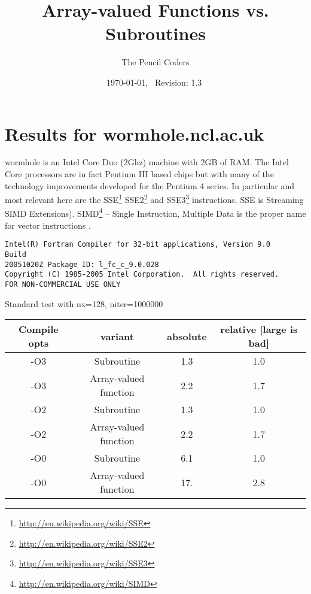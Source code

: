 \documentclass[a4paper,twoside,11pt]{article}
\newcommand{\fnurl}[1]{\footnote{\url{#1}}}
\begin{document}
\title{Array-valued Functions vs. Subroutines} %
\author{The Pencil Coders}          %
\date{\today,~ $ $Revision: 1.3 $ $}            %

\maketitle
\label{firstpage}


\section{Results for wormhole.ncl.ac.uk}
wormhole is an Intel Core Duo (2Ghz) machine with 2GB of RAM.  The Intel
Core processors are in fact Pentium III based chips but with many of the
technology improvements developed for the Pentium 4 series.  In particular
and most relevant here are the
SSE\fnurl{http://en.wikipedia.org/wiki/SSE}
SSE2\fnurl{http://en.wikipedia.org/wiki/SSE2} and
SSE3\fnurl{http://en.wikipedia.org/wiki/SSE3} instructions.  SSE is Streaming
SIMD Extensions). SIMD\fnurl{http://en.wikipedia.org/wiki/SIMD} -- Single Instruction, Multiple Data is the proper
name for vector instructions .
\begin{verbatim}
Intel(R) Fortran Compiler for 32-bit applications, Version 9.0    Build
20051020Z Package ID: l_fc_c_9.0.028
Copyright (C) 1985-2005 Intel Corporation.  All rights reserved.
FOR NON-COMMERCIAL USE ONLY
\end{verbatim}

Standard test with nx=128, niter=1000000

\begin{tabular}{cccc}
   Compile opts     &       variant       &     absolute & relative [large is bad] \\
\hline
   -O3     &  Subroutine            &    1.3    &   1.0 \\
   -O3     &  Array-valued function &    2.2    &   1.7 \\
\hline
   -O2     &  Subroutine            &    1.3    &   1.0 \\
   -O2     &  Array-valued function &    2.2    &   1.7 \\
\hline
   -O0     &  Subroutine            &    6.1    &   1.0 \\
   -O0     &  Array-valued function &    17.    &   2.8 \\
\hline
\end{tabular}
\end{document}
